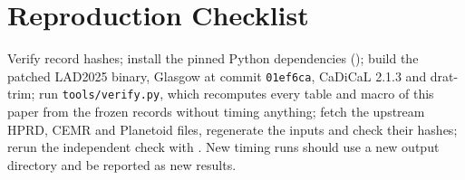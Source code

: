 \section{Reproduction Checklist}
Verify record hashes; install the pinned Python dependencies (); build the patched LAD2025 binary, Glasgow at commit \texttt{01ef6ca}, CaDiCaL 2.1.3 and drat-trim; run \texttt{tools/verify.py}, which recomputes every table and macro of this paper from the frozen records without timing anything; fetch the upstream HPRD, CEMR and Planetoid files, regenerate the inputs and check their hashes; rerun the independent check with . New timing runs should use a new output directory and be reported as new results.
